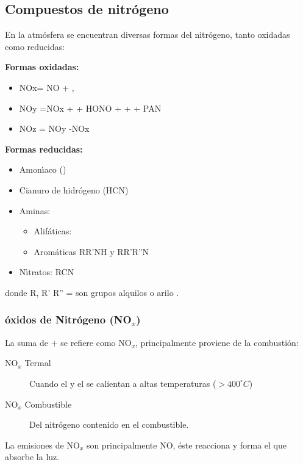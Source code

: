\subsection{Compuestos de nitr\'ogeno}
En la atm\'osfera se encuentran diversas formas del nitr\'ogeno, tanto oxidadas como reducidas:

\textbf{Formas oxidadas:}
\begin{itemize}
\item NOx= NO + ,
\item NOy =NOx +  + HONO +  +  + PAN
\item NOz = NOy -NOx
\end{itemize}

\textbf{Formas reducidas:}
\begin{itemize}
\item  Amon\'{\i}aco ()
\item Cianuro de hidr\'ogeno (HCN) 
\item Aminas:
\begin{itemize}
\item Alif\'aticas:  
\item Arom\'aticas  RR'NH y RR'R''N 
\end{itemize}
\item N\'{\i}tratos: RCN
\end{itemize}
 donde R, R' R'' = son grupos alquilos  o \gls{arilo} .

\subsubsection{\'oxidos de Nitr\'ogeno (NO$_x$)}
La suma de  +  se refiere como NO$_x$, principalmente proviene de la combusti\'on:
\begin{description}
\item[NO$_x$ Termal] Cuando el   y el  se calientan a altas temperaturas
($>400^\circ C$)
\item[NO$_x$ Combustible] Del nitr\'ogeno contenido en el combustible.
\end{description}
La emisiones de NO$_x$ son principalmente NO, \'este reacciona y forma el  que absorbe la luz.

